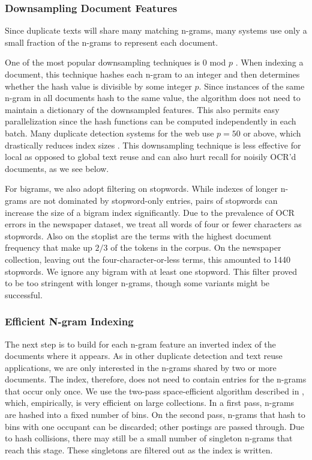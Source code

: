 \documentclass[pdftex,11pt]{article}
\begin{document}
\subsubsection{Downsampling Document Features}
\label{sec:downsampling}

Since duplicate texts will share many matching n-grams, many systems
use only a small fraction of the n-grams to represent each document.

One of the most popular downsampling techniques is 0 mod $p$
\cite{bernstein04:_scalab_system_ident_co_docum}.  When indexing a
document, this technique hashes each n-gram to an integer and then
determines whether the hash value is divisible by some integer $p$.
Since instances of the same n-gram in all documents hash to the same
value, the algorithm does not need to maintain a dictionary of the
downsampled features.  This also permits easy parallelization since
the hash functions can be computed independently in each batch.  Many
duplicate detection systems for the web use $p = 50$ or
above, which drastically reduces index sizes
\cite{henzinger06:_findin_near_duplic_web_pages}.  This downsampling
technique is less effective for local as opposed to global text reuse
\cite{seo08:_local_text_reuse_detec} and can also hurt recall for
noisily OCR'd documents, as we see below.

For bigrams, we also adopt filtering on stopwords.  While indexes of
longer n-grams are not dominated by stopword-only entries, pairs of
stopwords can increase the size of a bigram index significantly.  Due
to the prevalence of OCR errors in the newspaper dataset, we treat all
words of four or fewer characters as stopwords.  Also on the stoplist
are the terms with the highest document frequency that make up $2/3$
of the tokens in the corpus.  On the newspaper collection, leaving out
the four-character-or-less terms, this amounted to 1440 stopwords.  We
ignore any bigram with at least one stopword.  This filter proved to
be too stringent with longer n-grams, though some variants might be
successful.

\subsubsection{Efficient N-gram Indexing}
\label{sec:indexing}

The next step is to build for each n-gram feature an inverted index of
the documents where it appears.  As in other duplicate detection and
text reuse applications, we are only interested in the n-grams shared
by two or more documents.  The index, therefore, does not need to
contain entries for the n-grams that occur only once.  We use the
two-pass space-efficient algorithm described in
\citet{huston11:_effic_index_repeat}, which, empirically, is very
efficient on large collections.  In a first pass, n-grams are hashed
into a fixed number of bins.  On the second pass, n-grams that hash to
bins with one occupant can be discarded; other postings are passed
through.  Due to hash collisions, there may still be a small number of
singleton n-grams that reach this stage.  These singletons are
filtered out as the index is written.
\end{document}
